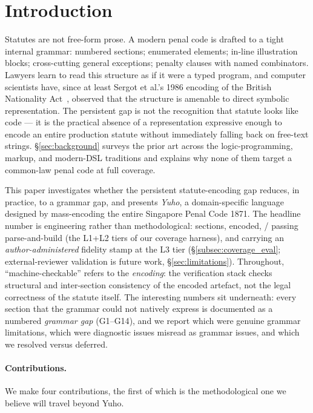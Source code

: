 \section{Introduction}
\label{sec:intro}

Statutes are not free-form prose. A modern penal code is drafted to a
tight internal grammar: numbered sections; enumerated elements; in-line
illustration blocks; cross-cutting general exceptions; penalty clauses
with named combinators. Lawyers learn to read this structure as if it
were a typed program, and computer scientists have, since at least
Sergot et al.'s 1986 encoding of the British Nationality
Act~\cite{sergot1986british}, observed that the structure is amenable
to direct symbolic representation. The persistent gap is not the
recognition that statute looks like code --- it is the practical
absence of a representation expressive enough to encode an entire
production statute without immediately falling back on free-text
strings. \S\ref{sec:background} surveys the prior art across the
logic-programming, markup, and modern-DSL traditions and explains why
none of them target a common-law penal code at full coverage.

This paper investigates whether the persistent statute-encoding gap
reduces, in practice, to a grammar gap, and presents \emph{Yuho}, a
domain-specific language designed by mass-encoding the entire Singapore
Penal Code 1871. The headline number is engineering rather than
methodological: \statRawSections{} sections, \statEncoded{} encoded,
\statLOnePass{}/\statRawSections{} passing parse-and-build (the L1+L2
tiers of our coverage harness), and \statLThreePass{} carrying an
\emph{author-administered} fidelity stamp at the L3 tier
(\S\ref{subsec:coverage_eval}; external-reviewer validation is future
work, \S\ref{sec:limitations}). Throughout, ``machine-checkable''
refers to the \emph{encoding}: the verification stack checks
structural and inter-section consistency of the encoded artefact, not
the legal correctness of the statute itself. The interesting numbers
sit underneath: every section that the grammar could not natively
express is documented as a numbered \emph{grammar gap}
(\textsf{G1}--\textsf{G14}), and we report which were genuine grammar
limitations, which were diagnostic issues misread as grammar issues,
and which we resolved versus deferred.

\paragraph{Contributions.} We make four contributions, the first of
which is the methodological one we believe will travel beyond Yuho.

